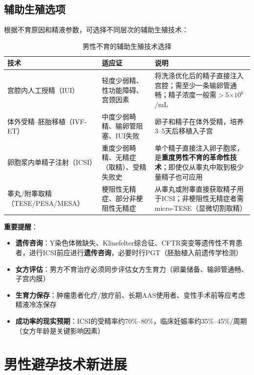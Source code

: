 \subsection{辅助生殖选项}

根据不育原因和精液参数，可选择不同层次的辅助生殖技术：

\begin{table}[htbp]
\centering
\caption{男性不育的辅助生殖技术选择}
\label{tab:art_options}
\begin{tabularx}{\textwidth}{@{}lXX@{}}
    \toprule
    \textbf{技术} & \textbf{适应证} & \textbf{说明} \\
    \midrule
    宫腔内人工授精（IUI） & 轻度少弱精、性功能障碍、宫颈因素 & 将洗涤优化后的精子直接注入宫腔；需至少一条输卵管通畅；精子浓度一般需$>$5$\times10^6$/mL \\
    \midrule
    体外受精--胚胎移植（IVF-ET） & 中度少弱畸精、输卵管阻塞、IUI失败 & 卵子和精子在体外受精，培养3--5天后移植入子宫 \\
    \midrule
    卵胞浆内单精子注射（ICSI） & 重度少弱畸精、无精症（取精）、受精失败史 & 单个精子直接注入卵子胞浆，是\textbf{重度男性不育的革命性技术}；即使仅从睾丸中取到极少量精子也可应用 \\
    \midrule
    睾丸/附睾取精（TESE/PESA/MESA） & 梗阻性无精症、部分非梗阻性无精症 & 从睾丸或附睾直接获取精子用于ICSI；非梗阻性无精症者需micro-TESE（显微切割取精） \\
    \bottomrule
\end{tabularx}
\end{table}

\textbf{重要提醒}：
\begin{itemize}[leftmargin=2cm]
	\item \textbf{遗传咨询}：Y染色体微缺失、Klinefelter综合征、CFTR突变等遗传性不育患者，进行ICSI前应进行\textbf{遗传咨询}，必要时行PGT（胚胎植入前遗传学检测）
	\item \textbf{女方评估}：男方不育治疗必须同步评估女方生育力（卵巢储备、输卵管通畅、子宫内膜）
	\item \textbf{生育力保存}：肿瘤患者化疗/放疗前、长期AAS使用者、变性手术前等应考虑精液冷冻保存
	\item \textbf{成功率的现实预期}：ICSI的受精率约70\%--80\%，临床妊娠率约35\%--45\%/周期（女方年龄是关键影响因素）
\end{itemize}

\section{男性避孕技术新进展}

